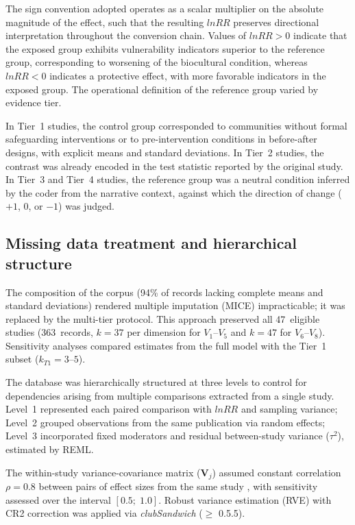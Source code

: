 \documentclass[12pt,a4paper]{article}
\begin{document}
The sign convention adopted operates as a scalar multiplier on the absolute magnitude of the effect, such that the resulting $lnRR$ preserves directional interpretation throughout the conversion chain. Values of $lnRR > 0$ indicate that the exposed group exhibits vulnerability indicators superior to the reference group, corresponding to worsening of the biocultural condition, whereas $lnRR < 0$ indicates a protective effect, with more favorable indicators in the exposed group. The operational definition of the reference group varied by evidence tier.

In Tier~1 studies, the control group corresponded to communities without formal safeguarding interventions or to pre-intervention conditions in before-after designs, with explicit means and standard deviations. In Tier~2 studies, the contrast was already encoded in the test statistic reported by the original study. In Tier~3 and Tier~4 studies, the reference group was a neutral condition inferred by the coder from the narrative context, against which the direction of change ($+1$, $0$, or $-1$) was judged.

\subsection{Missing data treatment and hierarchical structure}
\label{sec:missing}

The composition of the corpus (94\% of records lacking complete means and standard deviations) rendered multiple imputation (MICE) \citep{vanBuuren2011} impracticable; it was replaced by the multi-tier protocol. This approach preserved all 47~eligible studies (363~records, $k = 37$ per dimension for $V_1$--$V_5$ and $k = 47$ for $V_6$--$V_8$). Sensitivity analyses compared estimates from the full model with the Tier~1 subset ($k_{T1} = 3\text{--}5$).

The database was hierarchically structured at three levels \citep{Pustejovsky2022} to control for dependencies arising from multiple comparisons extracted from a single study. Level~1 represented each paired comparison with $lnRR$ and sampling variance; Level~2 grouped observations from the same publication via random effects; Level~3 incorporated fixed moderators and residual between-study variance ($\tau^2$), estimated by REML.

The within-study variance-covariance matrix ($\mathbf{V}_j$) assumed constant correlation $\rho = 0.8$ between pairs of effect sizes from the same study \citep{Pustejovsky2022}, with sensitivity assessed over the interval $[0.5;\; 1.0]$. Robust variance estimation (RVE) with CR2 correction was applied via \textit{clubSandwich} ($\geq$ 0.5.5).
\end{document}
